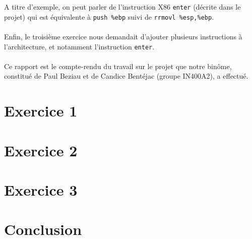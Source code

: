 \documentclass[12pt]{article}
\begin{document}
A titre d'exemple, on peut parler de l'instruction X86 \verb+enter+ (décrite dans le projet) qui est équivalente à \verb+push %ebp+ suivi de \verb+rrmovl %esp,%ebp+.

\paragraph{}Enfin, le troisième exercice nous demandait d'ajouter plusieurs instructions à l'architecture, et notamment l'instruction \verb+enter+.

\paragraph{}Ce rapport est le compte-rendu du travail sur le projet que notre binôme, constitué de Paul Beziau et de Candice Bentéjac (groupe IN400A2), a effectué.



\section{Exercice 1}



\section{Exercice 2}



\section{Exercice 3}

\section*{Conclusion}
\end{document}
